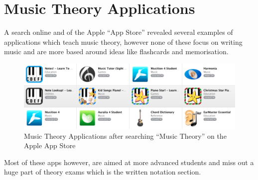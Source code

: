\section{Music Theory Applications}
\label{sec:music-theory-apps}
A search online and of the Apple ``App Store'' revealed several examples of applications which teach music theory, however none of these focus on writing music and are more based around ideas like flashcards and memorisation.

\begin{figure}[h!]
  \centering
  \includegraphics[width=\linewidth]{gfx/music-theory-apps.png}
  \caption{Music Theory Applications after searching ``Music Theory'' on the Apple App Store}
\end{figure}

Most of these apps however, are aimed at more advanced students and miss out a huge part of theory exams which is the written notation section.


